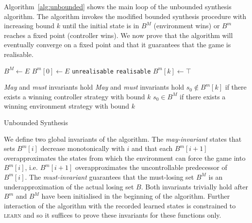 Algorithm~\ref{alg:unbounded} shows the main loop of the unbounded synthesis algorithm.  The algorithm invokes the modified bounded synthesis procedure with increasing bound $k$ until the initial state is in $B^M$ (environment wins) or $B^m$ reaches a fixed point (controller wins). We now prove that the algorithm will eventually converge on a fixed point and that it guarantees that the game is realisable.

\begin{algorithm}[h]
    \begin{algorithmic}[1]
            \State $B^M \gets E$
            \State $B^m[0] \gets E$
                    \State \Return \texttt{unrealisable} 
                \EndIf
                    \State \Return \texttt{realisable} 
                \EndIf
                \State $B^m[k] \gets \top$
                \State {}
            \EndFor
        \EndFunction
    \end{algorithmic}

    \begin{algorithmic}
        \Require \emph{May} and \emph{must} invariants hold
        \Ensure \emph{May} and \emph{must} invariants hold
        \Ensure $s_0 \not\in B^m[k]$ if there exists a winning controller strategy with bound $k$
        \Ensure $s_0 \in B^M$ if there exists a winning environment strategy with bound $k$
            \State \Return {}
        \EndFunction
    \end{algorithmic}
    \caption{Unbounded Synthesis}
    \label{alg:unbounded}
\end{algorithm}

We define two global invariants of the algorithm.  The \emph{may-invariant}
states that sets $B^m[i]$ decrease monotonically with $i$ and that each $B^m[i+1]$ overapproximates the states from which the environment can force the game into $B^m[i]$, i.e. $B^m[i+1]$ overapproximates the uncontrollable predecessor of $B^m[i]$.  The \emph{must-invariant} guarantees that the must-losing set $B^M$ is an underapproximation of the actual losing set $B$.  Both invariants trivially hold after $B^m$ and $B^M$ have been initialised in the beginning of the algorithm.  Further interaction of the algorithm with the recorded learned states is constrained to \textsc{learn} and  so it suffices to prove these invariants for these functions only.

